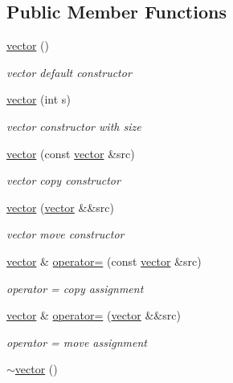 \subsection*{Public Member Functions}
\begin{DoxyCompactItemize}
\item 
\hyperlink{classmyStd_1_1vector_a40e5c01ceb5d0c2bc64b23005c21ba04}{vector} ()
\begin{DoxyCompactList}\small\item\em vector default constructor \end{DoxyCompactList}\item 
\hyperlink{classmyStd_1_1vector_a3f942029ffea510e3c6e67310c18abb7}{vector} (int s)
\begin{DoxyCompactList}\small\item\em vector constructor with size \end{DoxyCompactList}\item 
\hyperlink{classmyStd_1_1vector_ae425fb0a79cfa7870cf3603c8abe3369}{vector} (const \hyperlink{classmyStd_1_1vector}{vector} \&src)
\begin{DoxyCompactList}\small\item\em vector copy constructor \end{DoxyCompactList}\item 
\hyperlink{classmyStd_1_1vector_a76692ca684b66499d2877824e1404205}{vector} (\hyperlink{classmyStd_1_1vector}{vector} \&\&src)
\begin{DoxyCompactList}\small\item\em vector move constructor \end{DoxyCompactList}\item 
\hyperlink{classmyStd_1_1vector}{vector} \& \hyperlink{classmyStd_1_1vector_a5cbbf45fd8ead8b9cbf4b0c7acf5010f}{operator=} (const \hyperlink{classmyStd_1_1vector}{vector} \&src)
\begin{DoxyCompactList}\small\item\em operator = copy assignment \end{DoxyCompactList}\item 
\hyperlink{classmyStd_1_1vector}{vector} \& \hyperlink{classmyStd_1_1vector_a8aac18132c15abb44dea31300923ef3f}{operator=} (\hyperlink{classmyStd_1_1vector}{vector} \&\&src)
\begin{DoxyCompactList}\small\item\em operator = move assignment \end{DoxyCompactList}\item 
\hyperlink{classmyStd_1_1vector_aaf4331a544887b4358befcfbce2deab4}{$\sim$vector} ()

\end{DoxyCompactItemize}
